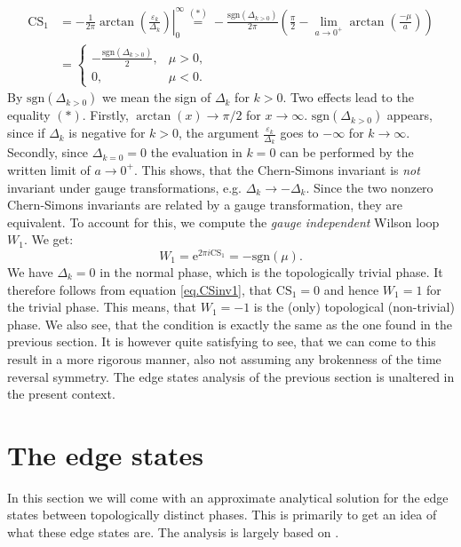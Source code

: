 \begin{align}
\text{CS}_1 &= - \frac{1}{2\pi} \left. \arctan\left(\frac{\varepsilon_k}{\Delta_k}\right)\right|^\infty_0 \overset{(*)}{=} -\frac{\text{sgn}(\Delta_{k>0})}{2\pi}\left(\frac{\pi}{2} - \lim_{a\to 0^{+}}\arctan\left(\frac{-\mu}{a}\right) \right) \nonumber \\
& = \left\{ \begin{matrix} -\frac{\text{sgn}(\Delta_{k>0})}{2}, & \mu > 0, \\ 0, & \mu < 0. \end{matrix} \right. 
\label{eq.CSinv2}
\end{align}
By $\text{sgn}(\Delta_{k>0})$ we mean the sign of $\Delta_k$ for $k > 0$. Two effects lead to the equality $(*)$. Firstly, $\arctan(x) \to \pi/2$ for $x \to \infty$. $\text{sgn}(\Delta_{k>0})$ appears, since if $\Delta_k$ is negative for $k > 0$, the argument $\frac{\varepsilon_k}{\Delta_k}$ goes to $-\infty$ for $k \to \infty$. Secondly, since $\Delta_{k=0} = 0$ the evaluation in $k = 0$ can be performed by the written limit of $a \to 0^+$. This shows, that the Chern-Simons invariant is \textit{not} invariant under gauge transformations, e.g. $\Delta_k \to - \Delta_k$. Since the two nonzero Chern-Simons invariants are related by a gauge transformation, they are equivalent. To account for this, we compute the \textit{gauge independent} Wilson loop $W_1$. We get: 
\begin{equation}
W_1 = \text{e}^{2\pi i \text{CS}_1} = -\text{sgn}(\mu). 
\end{equation}
We have $\Delta_k = 0$ in the normal phase, which is the topologically trivial phase. It therefore follows from equation \eqref{eq.CSinv1}, that $\text{CS}_1 = 0$ and hence $W_1 = 1$ for the trivial phase. This means, that $W_1 = -1$ is the (only) topological (non-trivial) phase. We also see, that the condition is exactly the same as the one found in the previous section. It is however quite satisfying to see, that we can come to this result in a more rigorous manner, also not assuming any brokenness of the time reversal symmetry. The edge states analysis of the previous section is unaltered in the present context.  

\section{The edge states}
\label{sec.edgestates}
In this section we will come with an approximate analytical solution for the edge states between topologically distinct phases. This is primarily to get an idea of what these edge states are. The analysis is largely based on \cite{BernevigTITSC}. 

